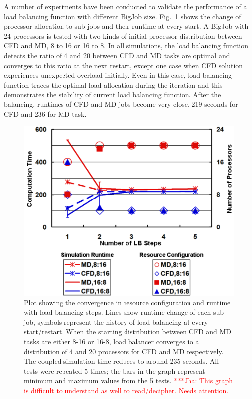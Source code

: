 \documentclass[conference,final]{IEEEtran}
\newcommand{\jhanote}[1]{ {\textcolor{red} { ***Jha: #1 }}}
\newcommand{\jhanote}[1]{}
\begin{document}
A number of experiments have been conducted to validate the performance of a load balancing function with different BigJob size. Fig.~\ref{fig:LB_Graph} shows the change of processor allocation to sub-jobs and their runtime at every start. A BigJob with 24 processors is tested with two kinds of initial processor distribution between CFD and MD, 8 to 16 or 16 to 8. In all simulations, the load balancing function detects the ratio of 4 and 20 between CFD and MD tasks are optimal and converges to this ratio at the next restart, except one case when CFD solution experiences unexpected overload initially. Even in this case, load balancing function traces the optimal load allocation during the iteration and this demonstrates the stability of current load balancing function. After the balancing, runtimes of CFD and MD jobs become very close, 219 seconds for CFD and 236 for MD task.

\begin{figure} \centering \includegraphics[scale=0.45]{LB_Graph2} \caption{\small Plot showing the convergence in resource configuration and runtime with load-balancing steps.  Lines show runtime change of each sub-job, symbols represent the history of load balancing at every start/restart. When the starting distribution between CFD and MD tasks are either 8-16 or 16-8, load balancer converges to a distribution of 4 and 20 processors for CFD and MD respectively. The coupled simulation time reduces to around 235 seconds. All tests were repeated 5 times; the bars in the graph represent minimum and maximum values from the 5 tests. \jhanote{This graph is difficult to understand as well to read/decipher. Needs attention.} } %
\label{fig:LB_Graph}
\end{figure}
\end{document}
